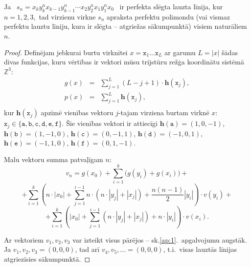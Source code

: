 \documentclass[utf8]{ludis2022}
\begin{document}
\begin{teorema}\label{th:1}
Ja \   $s_n =
x_k y_k^{n} x_{k-1} y_{k-1}^{n} \cdots
x_2 y_2^{n} x_1 y_1^{n} x_0
$ \
ir perfekta slēgta lauzta līnija, kur
$
n = 1,2,3,
$
tad virzienu virkne $s_n$ apraksta perfektu polimondu
(vai vismaz perfektu lauztu līniju, kura ir slēgta -- atgriežas sākumpunktā)
visiem naturāliem $n$.
\end{teorema}
\begin{proof}

Definējam jebkurai burtu 
virknītei $x=\mathtt{x}_1\ldots{}\mathtt{x}_L$ ar garumu $L = |x|$ 
šādas divas funkcijas, kuru vērtības ir vektori 
mūsu trijstūru režģa koordinātu sistēmā $\mathbb{Z}^3$:
\[
\begin{array}{rcl}
g(x) & = & \sum_{j = 1}^{L} (L - j + 1) \cdot \mathbf{h}(\mathtt{x}_j),\\
p(x) & = & \sum_{j = 1}^{L} \mathbf{h}(\mathtt{x}_j),\\
\end{array}
\]
kur $\mathbf{h}(\mathtt{x}_j)$ apzīmē
vienības vektoru $j$-tajam virziena burtam virknē $x$:
$\mathtt{x}_j \in \{ \mathtt{a}, \mathtt{b}, \mathtt{c}, \mathtt{d}, \mathtt{e}, \mathtt{f}\}$. Šie vienības vektori ir attiecīgi $\mathbf{h}(\mathtt{a}) = (1,0,-1)$, $\mathbf{h}(\mathtt{b}) = (1,-1,0)$, $\mathbf{h}(\mathtt{c}) = (0,-1,1)$, 
$\mathbf{h}(\mathtt{d}) = (-1,0,1)$, $\mathbf{h}(\mathtt{e}) = (-1,1,0)$, 
$\mathbf{h}(\mathtt{f}) = (0,1,-1)$.


Malu vektoru summa patvaļīgam $n$:
\[
v_n =
g(x_0)
+
\sum_{i=1}^{k}
\bigl(g(y_i)+g(x_i)\bigr)+
\]
\[
+
\sum_{i=1}^{k}
\left(
n\cdot |x_0|
+
\sum_{j=1}^{i-1}
n\cdot (n\cdot |y_j| + |x_j|)
+
\frac{n(n-1)}{2}|y_i|
\right)
\cdot v(y_i)+
\]
\[
+
\sum_{i=1}^{k}
\left(
|x_0|
+
\sum_{j=1}^{i-1}
(n\cdot |y_j| + |x_j|)
+
n\cdot |y_i|
\right)
\cdot v(x_i).
\]



\bigskip

Ar vektoriem $v_1,v_2,v_3$
var izteikt visus pārējos -- sk.\ref{ap:1}.\ apgalvojumu augstāk.
Ja $v_1,v_2,v_3=(0,0,0)$,
tad arī $v_4, v_5, ... =(0,0,0)$, t.i.\ visas lauztās līnijas
atgriezīsies sākumpunktā.

\end{proof}  
\end{document}
